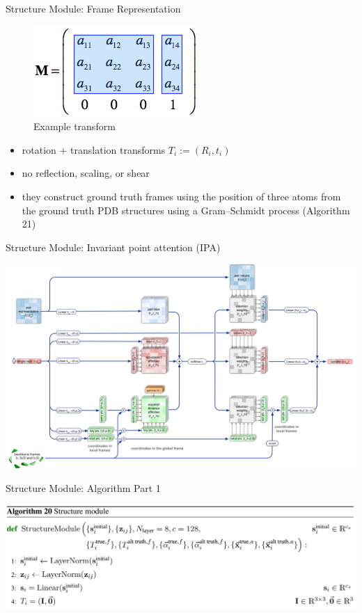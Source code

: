 \documentclass[presentation, smaller]{beamer}
\begin{document}
\begin{frame}[label={sec:orgbb3629a}]{Structure Module: Frame Representation}
\begin{figure}[htbp]
\centering
\includegraphics[scale=0.8]{./imgs/TransformationMatrix1.png}
\caption{Example transform \protect\cite{SpatialTransformationMatrices}}
\end{figure}

\begin{itemize}
\item rotation + translation transforms \(T_i := (R_i,t_i)\)
\item no reflection, scaling, or shear
\item they construct ground truth frames using the position of three atoms from the ground truth PDB structures using a Gram–Schmidt process (Algorithm 21)
\end{itemize}
\end{frame}
\begin{frame}[label={sec:org28b432d}]{Structure Module: Invariant point attention (IPA) \cite{jumperHighlyAccurateProtein2021}}
\begin{center}
\includegraphics[width=.9\linewidth]{./imgs/ipa.png}
\end{center}
\end{frame}

\begin{frame}[label={sec:orgdd356fb}]{Structure Module: Algorithm Part 1 \cite{jumperHighlyAccurateProtein2021}}
\begin{center}
\includegraphics[width=.9\linewidth]{./imgs/algo20-part1.png}
\end{center}
\end{frame}
\end{document}
